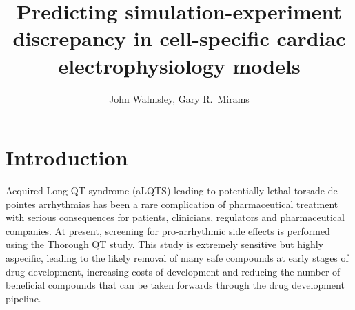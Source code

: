 \documentclass[11pt,a4paper,oneside]{article}
\author{John Walmsley, Gary R.~Mirams}
\title{Predicting simulation-experiment discrepancy in cell-specific cardiac electrophysiology models}
\begin{document}
\maketitle

\section{Introduction}

Acquired Long QT syndrome (aLQTS) leading to potentially lethal torsade de pointes arrhythmias has been a rare complication of pharmaceutical treatment with serious consequences for patients, clinicians, regulators and pharmaceutical companies. At present, screening for pro-arrhythmic side effects is performed using the Thorough QT study. This study is extremely sensitive but highly aspecific, leading to the likely removal of many safe compounds at early stages of drug development, increasing costs of development and reducing the number of beneficial compounds that can be taken forwards through the drug development pipeline.
\end{document}
